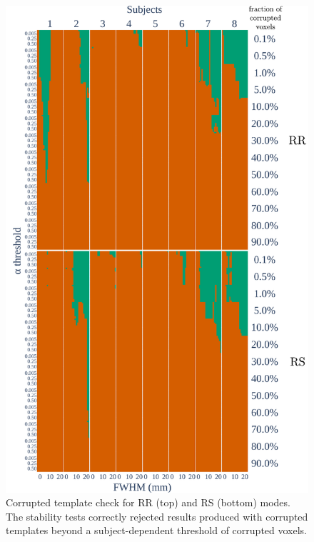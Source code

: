 \documentclass[lettersize,journal]{IEEEtran}
\newcommand{\TG}[1]{\color{orange}\textsc{From Tristan:} #1\color{black}\xspace}
\begin{document}

\begin{figure}
  \centering
  \includegraphics[width=\linewidth]{figures/template/template_fwe_bonferroni.pdf}
  \caption{Corrupted template check for RR (top) and RS (bottom) modes. The stability tests correctly rejected results produced with corrupted templates beyond a subject-dependent threshold of corrupted voxels.}
  \label{fig:template_bonferroni}
\end{figure}
\end{document}
